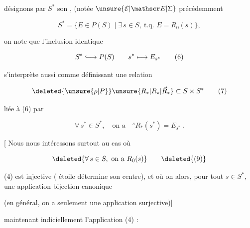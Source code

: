  désignons  par $S^*$ son ,
(notée $\unsure{\mathcal E|\mathscr E|\Sigma}$ précédemment

\[
 S^*=\{E\in P(S)\mid\exists\,s\in S,\ \text{t.q. }E=R_0(s)\}, \tag*{(5)}
\]

on note que l'inclusion identique

\[
 S^*\lhook\joinrel\longrightarrow P(S)\qquad s^*\longmapsto E_{s^*} \tag*{(6)}
\]

s'interprète aussi comme définissant une relation

\[
 \deleted{\unsure{\rho|P}}\unsure{R_*|R_{\star}|\vec{R}_*}\subset S\times S^* \tag*{(7)}
\]

liée à (6) par

\[
 \forall\,s^*\in S^*,\quad\text{on a}\quad{}^sR_*(s^*)=E_{s^*}\ . \tag*{(8)}
\]

[ Nous nous intéressons surtout au cas où

\[
 \deleted{\forall\,s\in S,\ \text{on a }R_0(s)} \tag*{\deleted{(9)}}
\]

(4) est injective ( étoile détermine son centre),
et où on  alors, pour tout $s\in S^*$, une
application bijection canonique


(en général, on a seulement une application surjective)]


 maintenant indiciellement l'application (4) :

